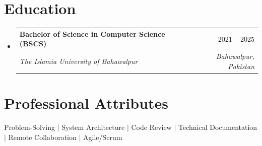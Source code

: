 \documentclass[letterpaper,11pt]{article}
\makeatletter
\newcommand{\resumeSubheading}[4]{
  \vspace{-2pt}\item
    \begin{tabular*}{0.97\textwidth}[t]{l@{\extracolsep{\fill}}r}
      \textbf{#1} & #2 \\
      \textit{\small#3} & \textit{\small #4} \\
    \end{tabular*}\vspace{-7pt}
}
\newcommand{\resumeSubHeadingListStart}{\begin{itemize}[leftmargin=0.15in, label={}]}
\newcommand{\resumeSubHeadingListEnd}{\end{itemize}}
\makeatother
\begin{document}
\section{Education}
  \resumeSubHeadingListStart
    \resumeSubheading
      {Bachelor of Science in Computer Science (BSCS)}{2021 -- 2025}
      {The Islamia University of Bahawalpur}{Bahawalpur, Pakistan}
  \resumeSubHeadingListEnd

\section{Professional Attributes}
 \begin{itemize}[leftmargin=0.15in, label={}]
    \small{\item{
     Problem-Solving $|$ System Architecture $|$ Code Review $|$ Technical Documentation $|$ Remote Collaboration $|$ Agile/Scrum
    }}
 \end{itemize}

\end{document}
